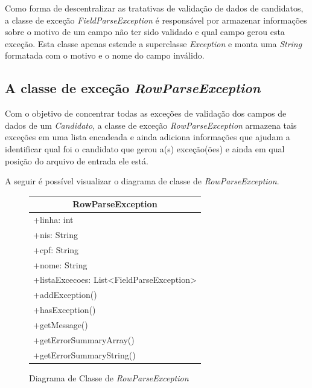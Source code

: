 \documentclass[
	12pt,			%
	openright,		%
	oneside,	
	a4paper,		%
	english,		%
	brazil			%
]{abntex2/abntex2}  %
\begin{document}
				Como forma de descentralizar as tratativas de validação de dados de candidatos, a classe de exceção \textit{FieldParseException} é responsável por armazenar informações sobre o motivo de um campo não ter sido validado e qual campo gerou esta exceção. Esta classe apenas estende a superclasse \textit{Exception} e monta uma \textit{String} formatada com o motivo e o nome do campo inválido.

			\subsection{A classe de exceção \textit{RowParseException}}	

				Com o objetivo de concentrar todas as exceções de validação dos campos de dados de um \textit{Candidato}, a classe de exceção \textit{RowParseException} armazena tais exceções em uma lista encadeada e ainda adiciona informações que ajudam a identificar qual foi o candidato que gerou a(s) exceção(ões) e ainda em qual posição do arquivo de entrada ele está.
	
				A seguir é possível visualizar o diagrama de classe de \textit{RowParseException}.
	
				\begin{figure}[ht]
					\begin{center}
						
						\caption{Diagrama de Classe de \textit{RowParseException}}
						\label{rowparseexception-uml}
			
						\begin{tabular}{|l|}
							\hline
							\multicolumn{1}{|c|}{\textbf{RowParseException}} \\ \hline
							+linha: int \\
							+nis: String \\
							+cpf: String \\
							+nome: String \\
							+listaExcecoes: List\textless{}FieldParseException\textgreater{} \\ \hline
							+addException() \\
							+hasException() \\
							+getMessage() \\
							+getErrorSummaryArray() \\
							+getErrorSummaryString() \\ \hline
						\end{tabular}
						
					\end{center}
				\end{figure}
\end{document}
